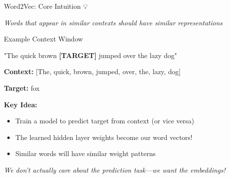 \documentclass[aspectratio=169]{beamer}
\begin{document}
\begin{frame}{Word2Vec: Core Intuition 💡}
\begin{center}
\Large
\textit{Words that appear in similar contexts should have similar representations}
\end{center}

\vspace{1em}

\begin{exampleblock}{Example Context Window}
\begin{center}
"The quick brown \textbf{[TARGET]} jumped over the lazy dog"
\end{center}

\textbf{Context:} [The, quick, brown, jumped, over, the, lazy, dog]

\textbf{Target:} fox
\end{exampleblock}

\vspace{1em}

\textbf{Key Idea:}
\begin{itemize}\setlength{\itemsep}{0pt}
    \item Train a model to predict target from context (or vice versa)
    \item The learned \alert{hidden layer weights} become our word vectors!
    \item Similar words will have similar weight patterns
\end{itemize}

\vspace{0.5em}
\begin{center}
\textit{We don't actually care about the prediction task—we want the embeddings!}
\end{center}
\end{frame}
\end{document}
